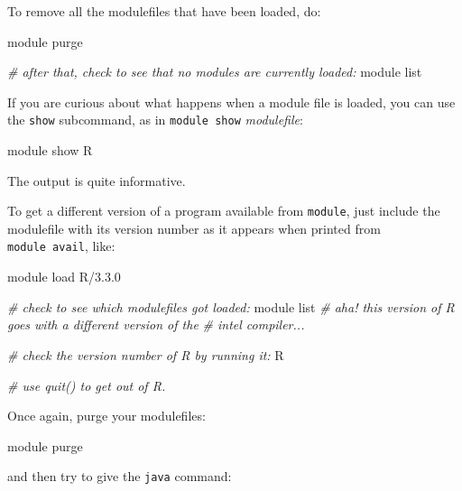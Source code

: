 \documentclass[]{krantz}
\makeatletter
\newenvironment{Shaded}{\begin{snugshade}}{\end{snugshade}}
\newcommand{\CommentTok}[1]{\textcolor[rgb]{0.37,0.37,0.37}{\textit{#1}}}
\newcommand{\ExtensionTok}[1]{#1}
\newcommand{\NormalTok}[1]{#1}
\newenvironment{kframe}{%
\medskip{}
\setlength{\fboxsep}{.8em}
 \def\at@end@of@kframe{}%
 \ifinner\ifhmode%
  \def\at@end@of@kframe{\end{minipage}}%
  \begin{minipage}{\columnwidth}%
 \fi\fi%
 \def\FrameCommand##1{\hskip\@totalleftmargin \hskip-\fboxsep
 \colorbox{shadecolor}{##1}\hskip-\fboxsep
     \hskip-\linewidth \hskip-\@totalleftmargin \hskip\columnwidth}%
 \MakeFramed {\advance\hsize-\width
   \@totalleftmargin\z@ \linewidth\hsize
   \@setminipage}}%
 {\par\unskip\endMakeFramed%
 \at@end@of@kframe}
\renewenvironment{Shaded}{\begin{kframe}}{\end{kframe}}
\makeatother
\begin{document}
To remove all the modulefiles that have been loaded, do:

\begin{Shaded}
\begin{Highlighting}[]
\ExtensionTok{module}\NormalTok{ purge}

\CommentTok{# after that, check to see that no modules are currently loaded:}
\ExtensionTok{module}\NormalTok{ list}
\end{Highlighting}
\end{Shaded}

If you are curious about what happens when a module file is loaded,
you can use the \texttt{show} subcommand, as in \texttt{module\ show} \emph{modulefile}:

\begin{Shaded}
\begin{Highlighting}[]
\ExtensionTok{module}\NormalTok{ show R}
\end{Highlighting}
\end{Shaded}

The output is quite informative.

To get a different version of a program available from \texttt{module}, just
include the modulefile with its version number as it appears when printed
from \texttt{module\ avail}, like:

\begin{Shaded}
\begin{Highlighting}[]
\ExtensionTok{module}\NormalTok{ load R/3.3.0}

\CommentTok{# check to see which modulefiles got loaded:}
\ExtensionTok{module}\NormalTok{ list  }
\CommentTok{# aha! this version of R goes with a different version of the}
\CommentTok{# intel compiler...}

\CommentTok{# check the version number of R by running it:}
\ExtensionTok{R}

\CommentTok{# use quit() to get out of R.}
\end{Highlighting}
\end{Shaded}

Once again, purge your modulefiles:

\begin{Shaded}
\begin{Highlighting}[]
\ExtensionTok{module}\NormalTok{ purge}
\end{Highlighting}
\end{Shaded}

and then try to give the \texttt{java} command:
\end{document}
